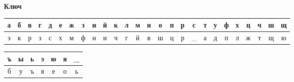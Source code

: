 \documentclass[a4paper,14pt]{extarticle}
\begin{document}
    \begin{center}
        \textbf{Ключ}
    \end{center}
    \vspace{-3em}
    \begin{center}
        \begin{tabular}{|c|c|c|c|c|c|c|c|c|c|c|c|c|c|c|c|c|c|c|c|c|c|c|c|c|c|}
            \hline
            а & б & в & г & д & е & ж & з & и & й & к & л & м & н & о & п & р & с & т & у & ф & х & ц & ч & ш & щ  \\
            \hline
            э & к & р & з & с & х & м & ф & н & и & ч & г & й & в & ш & ц & р &\_ & а & д & п & л & ж & т & щ & ю   \\
            \hline
        \end{tabular}
    \end{center}
    \begin{tabular}{|c|c|c|c|c|c|c|}
        \hline
        ъ & ы & ь & э & ю & я & \_ \\
        \hline
        б & у & ъ & я & е & о & ь \\
        \hline
    \end{tabular}\\
\end{document}
